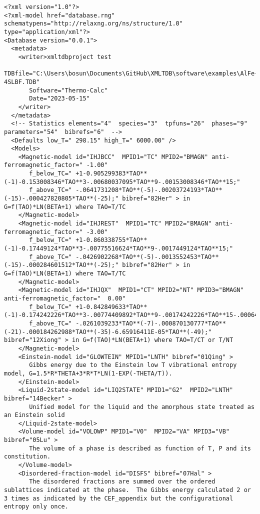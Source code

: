 \documentclass[12pt]{article}
\begin{document}
\begin{appendices}
{\tiny
\begin{verbatim}
<?xml version="1.0"?>
<?xml-model href="database.rng" schematypens="http://relaxng.org/ns/structure/1.0" type="application/xml"?>
<Database version="0.0.1">
  <metadata>
    <writer>xmltdbproject test
       TDBfile="C:\Users\bosun\Documents\GitHub\XMLTDB\software\examples\AlFe-4SLBF.TDB"
       Software="Thermo-Calc"
       Date="2023-05-15"
    </writer>
  </metadata>
  <!-- Statistics elements="4"  species="3"  tpfuns="26"  phases="9"  parameters="54"  bibrefs="6"  -->
  <Defaults low_T=" 298.15" high_T=" 6000.00" />
  <Models>
    <Magnetic-model id="IHJBCC"  MPID1="TC" MPID2="BMAGN" anti-ferromagnetic_factor=" -1.00" 
       f_below_TC=" +1-0.905299383*TAO**(-1)-0.153008346*TAO**3-.00680037095*TAO**9-.00153008346*TAO**15;"
       f_above_TC=" -.0641731208*TAO**(-5)-.00203724193*TAO**(-15)-.000427820805*TAO**(-25);" bibref="82Her" > in G=f(TAO)*LN(BETA+1) where TAO=T/TC
    </Magnetic-model>
    <Magnetic-model id="IHJREST"  MPID1="TC" MPID2="BMAGN" anti-ferromagnetic_factor=" -3.00" 
       f_below_TC=" +1-0.860338755*TAO**(-1)-0.17449124*TAO**3-.00775516624*TAO**9-.0017449124*TAO**15;"
       f_above_TC=" -.0426902268*TAO**(-5)-.0013552453*TAO**(-15)-.000284601512*TAO**(-25);" bibref="82Her" > in G=f(TAO)*LN(BETA+1) where TAO=T/TC
    </Magnetic-model>
    <Magnetic-model id="IHJQX"  MPID1="CT" MPID2="NT" MPID3="BMAGN" anti-ferromagnetic_factor="  0.00" 
       f_below_TC=" +1-0.842849633*TAO**(-1)-0.174242226*TAO**3-.00774409892*TAO**9-.00174242226*TAO**15-.000646538871*TAO**21;"
       f_above_TC=" -.0261039233*TAO**(-7)-.000870130777*TAO**(-21)-.000184262988*TAO**(-35)-6.65916411E-05*TAO**(-49);" bibref="12Xiong" > in G=f(TAO)*LN(BETA+1) where TAO=T/CT or T/NT
    </Magnetic-model>
    <Einstein-model id="GLOWTEIN" MPID1="LNTH" bibref="01Qing" > 
       Gibbs energy due to the Einstein low T vibrational entropy model, G=1.5*R*THETA+3*R*T*LN(1-EXP(-THETA/T)).
    </Einstein-model>
    <Liquid-2state-model id="LIQ2STATE" MPID1="G2"  MPID2="LNTH" bibref="14Becker" >
       Unified model for the liquid and the amorphous state treated as an Einstein solid
    </Liquid-2state-model>
    <Volume-model id="VOLOWP" MPID1="V0"  MPID2="VA" MPID3="VB" bibref="05Lu" >
       The volume of a phase is described as function of T, P and its constitution.
    </Volume-model>
    <Disordered-fraction-model id="DISFS" bibref="07Hal" >
       The disordered fractions are summed over the ordered sublattices indicated at the phase.  The Gibbs energy calculated 2 or 3 times as indicated by the CEF_appendix but the configurational entropy only once.

\end{verbatim}}
\end{appendices}
\end{document}
